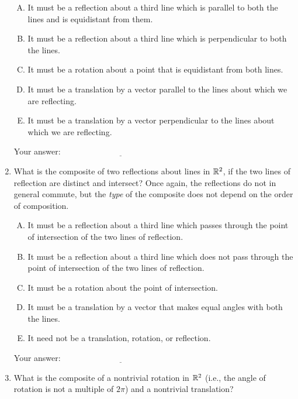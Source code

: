 \documentclass[10pt]{amsart}
\begin{document}
\begin{enumerate}
   \begin{enumerate}[(A)]
   \item It must be a reflection about a third line which is parallel
     to both the lines and is equidistant from them.
   \item It must be a reflection about a third line which is
     perpendicular to both the lines.
   \item It must be a rotation about a point that is equidistant from
     both lines.
   \item It must be a translation by a vector parallel to the lines
     about which we are reflecting.
   \item It must be a translation by a vector perpendicular to the
     lines about which we are reflecting.
   \end{enumerate}

   \vspace{0.1in}
   Your answer: $\underline{\qquad\qquad\qquad\qquad\qquad\qquad\qquad}$
   \vspace{0.1in}

 \item What is the composite of two reflections about lines in $\mathbb{R}^2$,
   if the two lines of reflection are distinct and intersect? Once
   again, the reflections do not in general commute, but the {\em type}
   of the composite does not depend on the order of composition.

   \begin{enumerate}[(A)]
   \item It must be a reflection about a third line which passes
     through the point of intersection of the two lines of reflection.
   \item It must be a reflection about a third line which does not pass
     through the point of intersection of the two lines of reflection.
   \item It must be a rotation about the point of intersection.
   \item It must be a translation by a vector that makes equal angles
     with both the lines.
   \item It need not be a translation, rotation, or reflection.
   \end{enumerate}

   \vspace{0.1in}
   Your answer: $\underline{\qquad\qquad\qquad\qquad\qquad\qquad\qquad}$
   \vspace{0.1in}

 \item What is the composite of a nontrivial rotation in $\mathbb{R}^2$ (i.e.,
   the angle of rotation is not a multiple of $2\pi$) and a nontrivial
   translation?


\end{enumerate}
\end{document}
